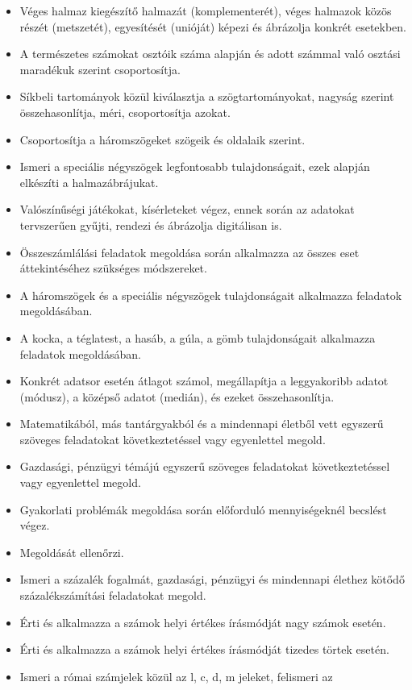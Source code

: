 \begin{itemize}
\item
  Véges halmaz kiegészítő halmazát (komplementerét), véges halmazok
  közös részét (metszetét), egyesítését (unióját) képezi és ábrázolja
  konkrét esetekben.
\item
  A természetes számokat osztóik száma alapján és adott számmal való
  osztási maradékuk szerint csoportosítja.
\item
  Síkbeli tartományok közül kiválasztja a szögtartományokat, nagyság
  szerint összehasonlítja, méri, csoportosítja azokat.
\item
  Csoportosítja a háromszögeket szögeik és oldalaik szerint.
\item
  Ismeri a speciális négyszögek legfontosabb tulajdonságait, ezek
  alapján elkészíti a halmazábrájukat.
\item
  Valószínűségi játékokat, kísérleteket végez, ennek során az adatokat
  tervszerűen gyűjti, rendezi és ábrázolja digitálisan is.
\item
  Összeszámlálási feladatok megoldása során alkalmazza az összes eset
  áttekintéséhez szükséges módszereket.
\item
  A háromszögek és a speciális négyszögek tulajdonságait alkalmazza
  feladatok megoldásában.
\item
  A kocka, a téglatest, a hasáb, a gúla, a gömb tulajdonságait
  alkalmazza feladatok megoldásában.
\item
  Konkrét adatsor esetén átlagot számol, megállapítja a leggyakoribb
  adatot (módusz), a középső adatot (medián), és ezeket összehasonlítja.
\item
  Matematikából, más tantárgyakból és a mindennapi életből vett egyszerű
  szöveges feladatokat következtetéssel vagy egyenlettel megold.
\item
  Gazdasági, pénzügyi témájú egyszerű szöveges feladatokat
  következtetéssel vagy egyenlettel megold.
\item
  Gyakorlati problémák megoldása során előforduló mennyiségeknél
  becslést végez.
\item
  Megoldását ellenőrzi.
\item
  Ismeri a százalék fogalmát, gazdasági, pénzügyi és mindennapi élethez
  kötődő százalékszámítási feladatokat megold.
\item
  Érti és alkalmazza a számok helyi értékes írásmódját nagy számok
  esetén.
\item
  Érti és alkalmazza a számok helyi értékes írásmódját tizedes törtek
  esetén.
\item
  Ismeri a római számjelek közül az l, c, d, m jeleket, felismeri az

\end{itemize}
